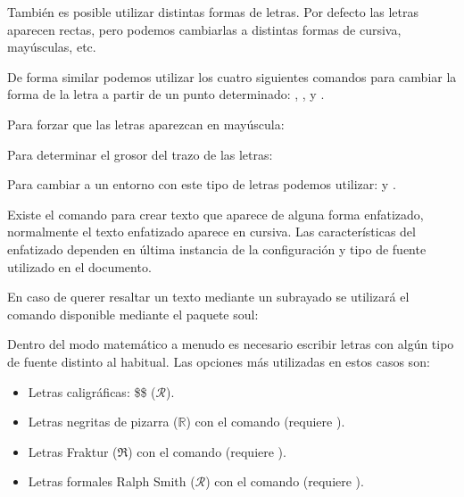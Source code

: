\documentclass[11pt, a4paper]{article}
\begin{document}
También es posible utilizar distintas formas de letras. Por defecto las letras aparecen rectas, pero podemos cambiarlas a distintas formas de cursiva, mayúsculas, etc.





De forma similar podemos utilizar los cuatro siguientes comandos para cambiar la forma de la letra a partir de un punto determinado: , ,  y .

Para forzar que las letras aparezcan en mayúscula:


Para determinar el grosor del trazo de las letras:



Para cambiar a un entorno con este tipo de letras podemos utilizar:  y .

Existe el comando  para crear texto que aparece de alguna forma enfatizado, normalmente el texto enfatizado aparece en cursiva. Las características del enfatizado dependen en última instancia de la configuración y tipo de fuente utilizado en el documento.

En caso de querer resaltar un texto mediante un subrayado se utilizará el comando  disponible mediante el paquete soul: 

	

Dentro del modo matemático a menudo es necesario escribir letras con algún tipo de fuente distinto al habitual. Las opciones más utilizadas en estos casos son:
\begin{itemize}
\item Letras caligráficas: \$\$ ($\mathcal{R}$).

\item Letras negritas de pizarra ($\mathbb{R}$) con el comando  (requiere ).

\item Letras Fraktur ($\mathfrak{R}$) con el comando  (requiere ).

\item Letras formales Ralph Smith ($\mathscr{R}$) con el comando  (requiere ).
\end{itemize}
\end{document}
